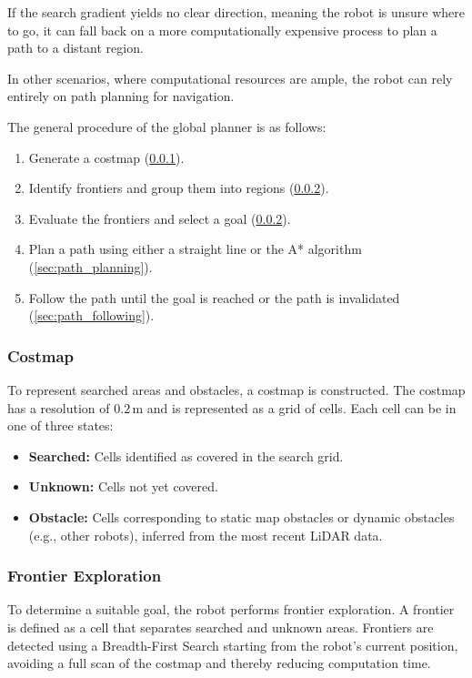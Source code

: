 If the search gradient yields no clear direction, meaning the robot is unsure where to go, it can fall back on a more computationally expensive process to plan a path to a distant region.

In other scenarios, where computational resources are ample, the robot can rely entirely on path planning for navigation.

The general procedure of the global planner is as follows:
\begin{enumerate}
  \item Generate a costmap (\cref{sec:costmap}).
  \item Identify frontiers and group them into regions (\cref{sec:frontier_exploration}).
  \item Evaluate the frontiers and select a goal (\cref{sec:frontier_exploration}).
  \item Plan a path using either a straight line or the A* algorithm (\cref{sec:path_planning}).
  \item Follow the path until the goal is reached or the path is invalidated (\cref{sec:path_following}).
\end{enumerate}

\subsubsection{Costmap}\label{sec:costmap}
To represent searched areas and obstacles, a costmap is constructed. 
The costmap has a resolution of $0.2\,\text{m}$ and is represented as a grid of cells. Each cell can be in one of three states:
\begin{itemize}
  \item \textbf{Searched:} Cells identified as covered in the search grid.
  \item \textbf{Unknown:} Cells not yet covered.
  \item \textbf{Obstacle:} Cells corresponding to static map obstacles or dynamic obstacles (e.g., other robots), inferred from the most recent LiDAR data.
\end{itemize}

\subsubsection{Frontier Exploration}\label{sec:frontier_exploration}
To determine a suitable goal, the robot performs frontier exploration.
A frontier is defined as a cell that separates searched and unknown areas.
Frontiers are detected using a Breadth-First Search starting from the robot’s current position, avoiding a full scan of the costmap and thereby reducing computation time.

